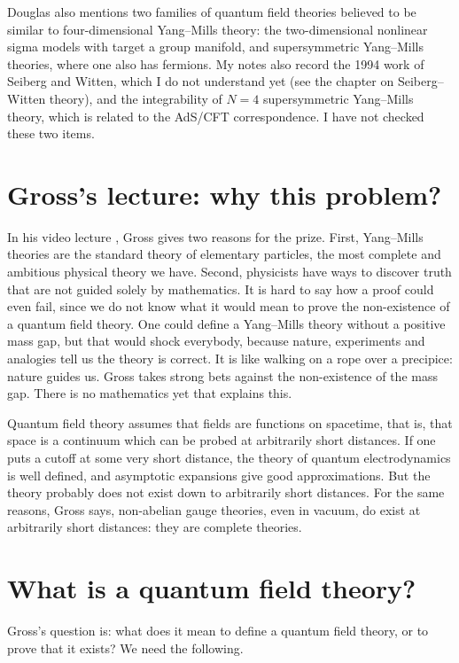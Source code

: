Douglas also mentions two families of quantum
field theories believed to be similar to
four-dimensional Yang--Mills theory: the
two-dimensional nonlinear sigma models with
target a group manifold, and supersymmetric
Yang--Mills theories, where one also has
fermions. My notes also record the 1994 work
of Seiberg and Witten, which I do not
understand yet (see the chapter on
Seiberg--Witten theory), and the
integrability of $N=4$ supersymmetric
Yang--Mills theory, which is related to the
AdS/CFT correspondence. I have not checked
these two items.

\section{Gross's lecture: why this problem?}

In his video lecture \cite{gross-video},
Gross gives two reasons for the prize. First,
Yang--Mills theories are the standard theory
of elementary particles, the most complete
and ambitious physical theory we have.
Second, physicists have ways to discover
truth that are not guided solely by
mathematics. It is hard to say how a proof
could even fail, since we do not know what it
would mean to prove the non-existence of a
quantum field theory. One could define a
Yang--Mills theory without a positive mass
gap, but that would shock everybody, because
nature, experiments and analogies tell us the
theory is correct. It is like walking on a
rope over a precipice: nature guides us.
Gross takes strong bets against the
non-existence of the mass gap. There is no
mathematics yet that explains this.

Quantum field theory assumes that fields are
functions on spacetime, that is, that space
is a continuum which can be probed at
arbitrarily short distances. If one puts a
cutoff at some very short distance, the
theory of quantum electrodynamics is well
defined, and asymptotic expansions give good
approximations. But the theory probably does
not exist down to arbitrarily short
distances. For the same reasons, Gross says,
non-abelian gauge theories, even in vacuum,
do exist at arbitrarily short distances: they
are complete theories.

\section{What is a quantum field theory?}

Gross's question is: what does it mean to
define a quantum field theory, or to prove
that it exists? We need the following.

